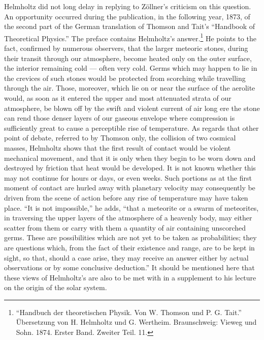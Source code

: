 \documentclass[a4paper, 11pt, oneside, english]{article}
\begin{document}
Helmholtz did not long delay in replying to Zöllner's criticism on this question. An opportunity occurred during the publication, in the following year, 1873, of the second part of the German translation of Thomson and Tait's ``Handbook of Theoretical Physics.'' The preface contains Helmholtz's answer.\footnote{``Handbuch der theoretischen Physik. Von W. Thomson und P. G. Tait.'' Übersetzung von H. Helmholtz und G. Wertheim. Braunschweig: Vieweg und Sohn. 1874. Erster Band. Zweiter Teil. 11.} He points to the fact, confirmed by numerous observers, that the larger meteoric stones, during their transit through our atmosphere, become heated only on the outer surface, the interior remaining cold --- often very cold. Germs which may happen to lie in the crevices of such stones would be protected from scorching while travelling through the air. Those, moreover, which lie on or near the surface of the aerolite would, as soon as it entered the upper and most attenuated strata of our atmosphere, be blown off by the swift and violent current of air long ere the stone can rend those denser layers of our gaseous envelope where compression is sufficiently great to cause a perceptible rise of temperature. As regards that other point of debate, referred to by Thomson only, the collision of two cosmical masses, Helmholtz shows that the first result of contact would be violent mechanical movement, and that it is only when they begin to be worn down and destroyed by friction that heat would be developed. It is not known whether this may not continue for hours or days, or even weeks. Such portions as at the first moment of contact are hurled away with planetary velocity may consequently be driven from the scene of action before any rise of temperature may have taken place. ``It is not impossible,'' he adds, ``that a meteorite or a swarm of meteorites, in traversing the upper layers of the atmosphere of a heavenly body, may either scatter from them or carry with them a quantity of air containing unscorched germs. These are possibilities which are not yet to be taken as probabilities; they are questions which, from the fact of their existence and range, are to be kept in sight, so that, should a case arise, they may receive an answer either by actual observations or by some conclusive deduction.'' It should be mentioned here that these views of Helmholtz's are also to be met with in a supplement to his lecture on the origin of the solar system.
\end{document}
